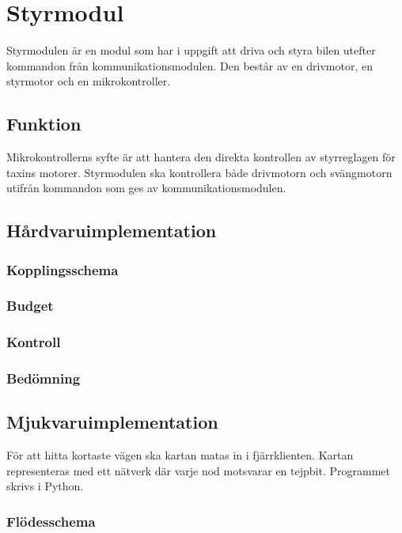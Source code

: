 \documentclass[designspec/spec.tex]{subfiles}
\begin{document}
\section{Styrmodul}
Styrmodulen är en modul som har i uppgift att driva och styra bilen utefter
kommandon från kommunikationsmodulen. Den består av en drivmotor, en styrmotor
och en mikrokontroller.

\subsection{Funktion}
Mikrokontrollerns syfte är att hantera den direkta kontrollen av styrreglagen
för taxins motorer. Styrmodulen ska kontrollera både drivmotorn och svängmotorn
utifrån kommandon som ges av kommunikationsmodulen.

\subsection{Hårdvaruimplementation}

\subsubsection{Kopplingsschema}

\subsubsection{Budget}

\subsubsection{Kontroll}

\subsubsection{Bedömning}

\subsection{Mjukvaruimplementation}
För att hitta kortaste vägen ska kartan matas in i fjärrklienten. Kartan
representeras med ett nätverk där varje nod motsvarar en tejpbit. Programmet
skrivs i Python.

\subsubsection{Flödesschema}
\end{document}
